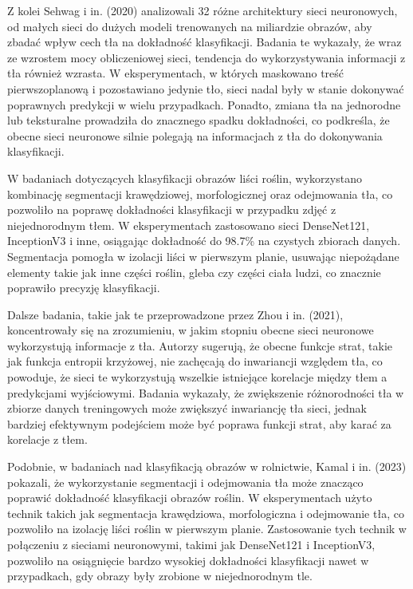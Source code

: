 Z kolei Sehwag i in. (2020) analizowali 32 różne architektury sieci neuronowych, od małych sieci do 
dużych modeli trenowanych na miliardzie obrazów, aby zbadać wpływ cech tła na dokładność klasyfikacji. 
Badania te wykazały, że wraz ze wzrostem mocy obliczeniowej sieci, tendencja do wykorzystywania 
informacji z tła również wzrasta. W eksperymentach, w których maskowano treść pierwszoplanową i 
pozostawiano jedynie tło, sieci nadal były w stanie dokonywać poprawnych predykcji w wielu 
przypadkach. Ponadto, zmiana tła na jednorodne lub teksturalne prowadziła do znacznego spadku 
dokładności, co podkreśla, że obecne sieci neuronowe silnie polegają na informacjach z tła do 
dokonywania klasyfikacji.

W badaniach dotyczących klasyfikacji obrazów liści roślin, wykorzystano kombinację segmentacji 
krawędziowej, morfologicznej oraz odejmowania tła, co pozwoliło na poprawę dokładności klasyfikacji 
w przypadku zdjęć z niejednorodnym tłem. W eksperymentach zastosowano sieci DenseNet121, 
InceptionV3 i inne, osiągając dokładność do 98.7\% na czystych zbiorach danych. Segmentacja pomogła 
w izolacji liści w pierwszym planie, usuwając niepożądane elementy takie jak inne części roślin, 
gleba czy części ciała ludzi, co znacznie poprawiło precyzję klasyfikacji.


Dalsze badania, takie jak te przeprowadzone przez Zhou i in. (2021), koncentrowały się na 
zrozumieniu, w jakim stopniu obecne sieci neuronowe wykorzystują informacje z tła. Autorzy sugerują, 
że obecne funkcje strat, takie jak funkcja entropii krzyżowej, nie zachęcają do inwariancji względem 
tła, co powoduje, że sieci te wykorzystują wszelkie istniejące korelacje między tłem a predykcjami 
wyjściowymi. Badania wykazały, że zwiększenie różnorodności tła w zbiorze danych treningowych może 
zwiększyć inwariancję tła sieci, jednak bardziej efektywnym podejściem może być poprawa funkcji 
strat, aby karać za korelacje z tłem.


Podobnie, w badaniach nad klasyfikacją obrazów w rolnictwie, Kamal i in. (2023) pokazali, 
że wykorzystanie segmentacji i odejmowania tła może znacząco poprawić dokładność klasyfikacji 
obrazów roślin. W eksperymentach użyto technik takich jak segmentacja krawędziowa, morfologiczna i 
odejmowanie tła, co pozwoliło na izolację liści roślin w pierwszym planie. Zastosowanie tych 
technik w połączeniu z sieciami neuronowymi, takimi jak DenseNet121 i InceptionV3, pozwoliło na 
osiągnięcie bardzo wysokiej dokładności klasyfikacji nawet w przypadkach, gdy obrazy były zrobione 
w niejednorodnym tle.


